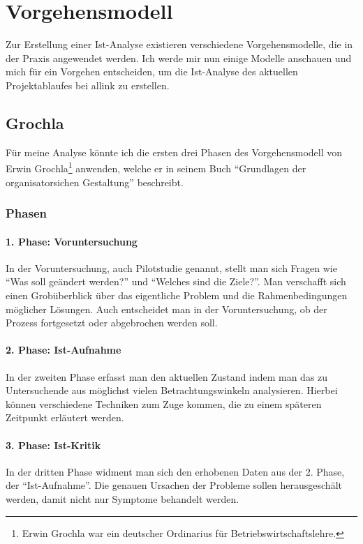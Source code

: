 \section{Vorgehensmodell}
Zur Erstellung einer Ist-Analyse existieren verschiedene Vorgehensmodelle, die
in der Praxis angewendet werden. Ich werde mir nun einige Modelle anschauen und 
mich für ein Vorgehen entscheiden, um die Ist-Analyse des aktuellen
Projektablaufes bei allink zu erstellen.

\subsection{Grochla}
Für meine Analyse könnte ich die ersten drei Phasen des Vorgehensmodell von 
Erwin Grochla\footnote{Erwin Grochla war ein deutscher Ordinarius für Betriebswirtschaftslehre.}
anwenden, welche er in seinem Buch ``Grundlagen der organisatorsichen Gestaltung''\cite[S. 44-74]{grochla1982grundlagen} 
beschreibt.

\subsubsection{Phasen}

\paragraph{1. Phase: Voruntersuchung}
In der Voruntersuchung, auch Pilotstudie genannt, stellt man sich Fragen wie
``Was soll geändert werden?'' und ``Welches sind die Ziele?''. Man verschafft
sich einen Grobüberblick über das eigentliche Problem und die Rahmenbedingungen
möglicher Lösungen. Auch entscheidet man in der Voruntersuchung, ob der Prozess
fortgesetzt oder abgebrochen werden soll.

\paragraph{2. Phase: Ist-Aufnahme}
In der zweiten Phase erfasst man den aktuellen Zustand indem 
man das zu Untersuchende aus möglichst vielen Betrachtungswinkeln analysieren.
Hierbei können verschiedene Techniken zum Zuge kommen, die zu einem späteren
Zeitpunkt erläutert werden.

\paragraph{3. Phase: Ist-Kritik}
In der dritten Phase widment man sich den erhobenen Daten aus der 2. Phase, 
der ``Ist-Aufnahme''. Die genauen Ursachen der Probleme sollen herausgeschält
werden, damit nicht nur Symptome behandelt werden.

